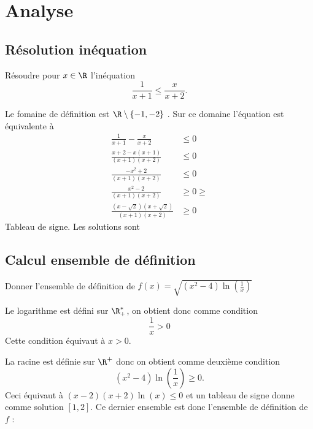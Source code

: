 \section{Analyse}
\subsection{Résolution inéquation}

\begin{exercice}
Résoudre pour $x \in \R$ l'inéquation $$\frac{1}{x+1}\leq \frac{x}{x+2}.$$
\end{exercice}



\begin{correction}
Le fomaine de définition est $\R\setminus\{ -1, -2\}$ . Sur ce domaine l'équation est équivalente à 
\begin{align*}
\frac{1}{x+1}-\frac{x}{x+2}&\leq 0\\
\frac{x+2-x(x+1)}{(x+1)(x+2)}&\leq 0\\
\frac{-x^2+2}{(x+1)(x+2)}&\leq 0\\
\frac{x^2-2}{(x+1)(x+2)}&\geq 0\geq\\
\frac{(x-\sqrt{2})(x+\sqrt{2})}{(x+1)(x+2)}&\geq 0
\end{align*}
Tableau de signe. 
Les solutions sont 
\begin{center}
\fbox{$\cS =]-\infty, -2[\cup [-\sqrt{2}, -1[\cup [\sqrt{2}, +\infty[$. }
\end{center}


\end{correction}


\subsection{Calcul ensemble de définition}
\begin{exercice}
Donner l'ensemble de définition de $f(x) = \sqrt{ (x^2-4)\ln\left(\frac{1}{x}\right)}$
\end{exercice}


\begin{correction}


Le logarithme est défini sur $\R^*_+$, on obtient donc comme condition 
$$\frac{1}{x}>0$$
Cette  condition équivaut à $x>0$.

La racine est définie sur $\R^+$ donc on obtient comme deuxième condition 
$$(x^2-4)\ln(\frac{1}{x}) \geq 0.$$
Ceci équivaut à $(x-2)(x+2) \ln(x)\leq 0$ et un tableau de signe donne comme solution $[1,2]$.
Ce dernier ensemble est donc l'ensemble de définition de $f$ :

\begin{center}
\end{center}
\end{correction}


